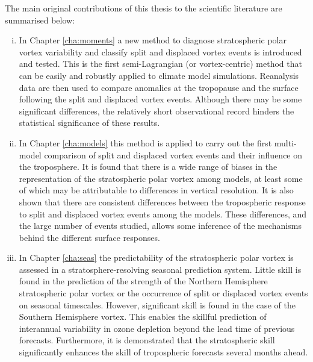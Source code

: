 The main original contributions of this thesis to the scientific literature are
summarised below:
\begin{enumerate}[i.]
\item In Chapter \ref{cha:moments} a new method to diagnose stratospheric polar
  vortex variability and classify split and displaced vortex events is
  introduced and tested. This is the first semi-Lagrangian (or vortex-centric)
  method that can be easily and robustly applied to climate model
  simulations. Reanalysis data are then used to compare anomalies at the
  tropopause and the surface following the split and displaced vortex
  events. Although there may be some significant differences, the relatively
  short observational record hinders the statistical significance of these
  results.

\item In Chapter \ref{cha:models} this method is applied to carry out the first
  multi-model comparison of split and displaced vortex events and their
  influence on the troposphere. It is found that there is a wide range of biases
  in the representation of the stratospheric polar vortex among models, at least
  some of which may be attributable to differences in vertical resolution. It is
  also shown that there are consistent differences between the tropospheric
  response to split and displaced vortex events among the models. These
  differences, and the large number of events studied, allows some inference of
  the mechanisms behind the different surface responses.

\item In Chapter \ref{cha:seas} the predictability of the stratospheric polar
  vortex is assessed in a stratosphere-resolving seasonal prediction
  system. Little skill is found in the prediction of the strength of the
  Northern Hemisphere stratospheric polar vortex or the occurrence of split or
  displaced vortex events on seasonal timescales. However, significant skill is
  found in the case of the Southern Hemisphere vortex. This enables the skillful
  prediction of interannual variability in ozone depletion beyond the lead time
  of previous forecasts. Furthermore, it is demonstrated that the stratospheric
  skill significantly enhances the skill of tropospheric forecasts several
  months ahead.

\end{enumerate}

